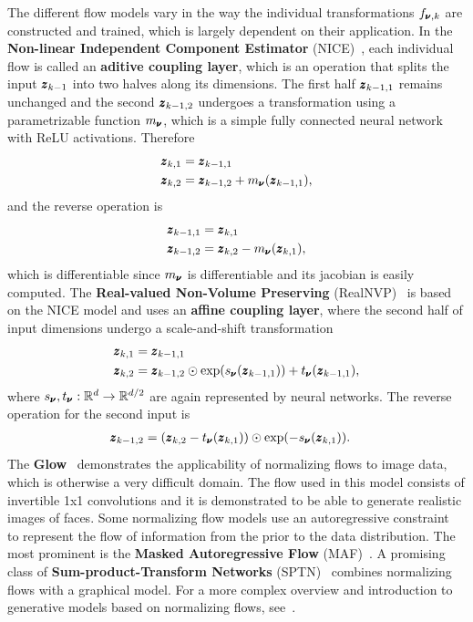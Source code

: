 The different flow models vary in the way the individual transformations $f_{\pmb{{\nu}},k}$ are constructed and trained, which is largely dependent on their application. In the \textbf{Non-linear Independent Component Estimator} (NICE)~\cite{dinh2014nice}, each individual flow is called an  \textbf{aditive coupling layer}, which is an operation that splits the input $\pmb{{z}}_{k-1}$ into two halves along its dimensions. The first half $\pmb{{z}}_{k-1,1}$ remains unchanged and the second $\pmb{{z}}_{k-1,2}$ undergoes a transformation using a parametrizable function $m_{\pmb{{\nu}}}$, which is a simple fully connected neural network with ReLU activations. Therefore
\begin{align}
    \pmb{{z}}_{k,1} & = \pmb{{z}}_{k-1,1} \\
    \pmb{{z}}_{k,2} & = \pmb{{z}}_{k-1,2} + m_{\pmb{{\nu}}}(\pmb{{z}}_{k-1,1}), 
\end{align}
and the reverse operation is 
\begin{align}
    \pmb{{z}}_{k-1,1} & = \pmb{{z}}_{k,1} \\
    \pmb{{z}}_{k-1,2} & = \pmb{{z}}_{k,2} - m_{\pmb{{\nu}}}(\pmb{{z}}_{k,1}), 
\end{align}
which is differentiable since $m_{\pmb{{\nu}}}$ is differentiable and its jacobian is easily computed. The \textbf{Real-valued Non-Volume Preserving} (RealNVP)~\cite{dinh2016density} is based on the NICE model and uses an \textbf{affine coupling layer}, where the second half of input dimensions undergo a scale-and-shift transformation
\begin{align}
    \pmb{{z}}_{k,1} & = \pmb{{z}}_{k-1,1} \\
    \pmb{{z}}_{k,2} & = \pmb{{z}}_{k-1,2} \odot \exp(s_{\pmb{{\nu}}}(\pmb{{z}}_{k-1,1})) + t_{\pmb{{\nu}}}(\pmb{{z}}_{k-1,1}), 
\end{align}
where $s_{\pmb{{\nu}}},t_{\pmb{{\nu}}}:\mathbb{R}^d \rightarrow \mathbb{R}^{d/2}$ are again represented by neural networks. The reverse operation for the second input is 
\begin{align}
    \pmb{{z}}_{k-1,2} & = (\pmb{{z}}_{k,2}  - t_{\pmb{{\nu}}}(\pmb{{z}}_{k,1})) \odot \exp(-s_{\pmb{{\nu}}}(\pmb{{z}}_{k,1})).
\end{align}
The \textbf{Glow}~\cite{kingma2018glow} demonstrates the applicability of normalizing flows to image data, which is otherwise a very difficult domain. The flow used in this model consists of invertible 1x1 convolutions and it is demonstrated to be able to generate realistic images of faces. Some normalizing flow models use an autoregressive constraint~\cite{kingma2016improved} to represent the flow of information from the prior to the data distribution. The most prominent is the \textbf{Masked Autoregressive Flow} (MAF)~\cite{papamakariosMaskedAutoregressiveFlow2018}. A promising class of \textbf{Sum-product-Transform Networks} (SPTN)~\cite{pevny2020sum} combines normalizing flows with a graphical model. For a more complex overview and introduction to generative models based on normalizing flows, see~\cite{papamakariosNormalizingFlowsProbabilistic2019, kobyzevNormalizingFlowsIntroduction2020}. 

